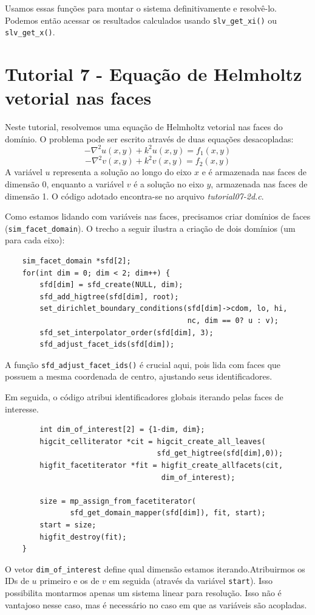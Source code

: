 Usamos essas funções para montar o sistema definitivamente e resolvê-lo. Podemos então acessar os resultados calculados usando \texttt{slv\_get\_xi()} ou \texttt{slv\_get\_x()}.


\section{Tutorial 7 - Equação de Helmholtz vetorial nas faces}
\label{sec:tut7}

Neste tutorial, resolvemos uma equação de Helmholtz vetorial nas faces do domínio. O problema pode ser escrito através de duas equações desacopladas:
$$ -\nabla^2u(x,y) + k^2u(x,y) = f_1(x,y) $$
$$ -\nabla^2v(x,y) + k^2v(x,y) = f_2(x,y) $$
A variável $u$ representa a solução ao longo do eixo $x$ e é armazenada nas faces de dimensão 0, enquanto a variável $v$ é a solução no eixo $y$, armazenada nas faces de dimensão 1. O código adotado encontra-se no arquivo \textit{tutorial07-2d.c}.

Como estamos lidando com variáveis nas faces, precisamos criar domínios de faces (\texttt{sim\_facet\_domain}). O trecho a seguir ilustra a criação de dois domínios (um para cada eixo):
\begin{verbatim}
    sim_facet_domain *sfd[2];
    for(int dim = 0; dim < 2; dim++) {
        sfd[dim] = sfd_create(NULL, dim);
        sfd_add_higtree(sfd[dim], root);
        set_dirichlet_boundary_conditions(sfd[dim]->cdom, lo, hi, 
                                          nc, dim == 0? u : v);
        sfd_set_interpolator_order(sfd[dim], 3);
        sfd_adjust_facet_ids(sfd[dim]); 
\end{verbatim}
A função \texttt{sfd\_adjust\_facet\_ids()} é crucial aqui, pois lida com faces que possuem a mesma coordenada de centro, ajustando seus identificadores.

Em seguida, o código atribui identificadores globais iterando pelas faces de interesse.
\begin{verbatim}
        int dim_of_interest[2] = {1-dim, dim}; 
        higcit_celliterator *cit = higcit_create_all_leaves(
                                   sfd_get_higtree(sfd[dim],0));
        higfit_facetiterator *fit = higfit_create_allfacets(cit, 
                                    dim_of_interest); 
                                    
        size = mp_assign_from_facetiterator(
               sfd_get_domain_mapper(sfd[dim]), fit, start);
        start = size;
        higfit_destroy(fit);
    }
\end{verbatim}
O vetor \texttt{dim\_of\_interest} define qual dimensão estamos iterando.Atribuirmos os IDs de $u$ primeiro e os de $v$ em seguida (através da variável \texttt{start}). Isso possibilita montarmos apenas um sistema linear para resolução. Isso não é vantajoso nesse caso, mas é necessário no caso em que as variáveis são acopladas. 

